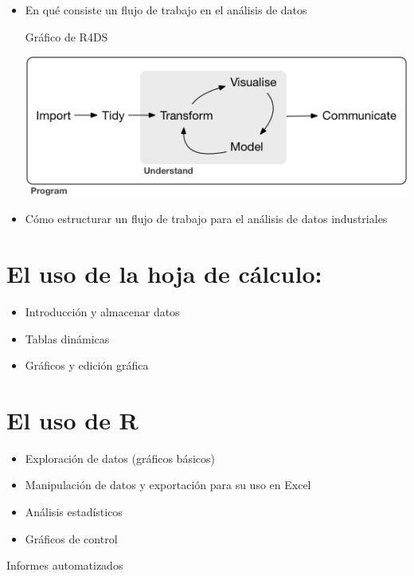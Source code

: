 \documentclass[
  letterpaper,
  DIV=11,
  numbers=noendperiod,
  oneside]{scrreprt}
\begin{document}
\begin{itemize}
\item
  En qué consiste un flujo de trabajo en el análisis de datos

  Gráfico de R4DS

  \includegraphics{01-imagenes/data-science.png}
\item
  Cómo estructurar un flujo de trabajo para el análisis de datos
  industriales
\end{itemize}

\hypertarget{el-uso-de-la-hoja-de-cuxe1lculo}{%
\section{El uso de la hoja de
cálculo:}\label{el-uso-de-la-hoja-de-cuxe1lculo}}

\begin{itemize}
\item
  Introducción y almacenar datos
\item
  Tablas dinámicas
\item
  Gráficos y edición gráfica
\end{itemize}

\hypertarget{el-uso-de-r}{%
\section{El uso de R}\label{el-uso-de-r}}

\begin{itemize}
\item
  Exploración de datos (gráficos básicos)
\item
  Manipulación de datos y exportación para su uso en Excel
\item
  Análisis estadísticos
\item
  Gráficos de control
\end{itemize}

Informes automatizados

\end{document}
